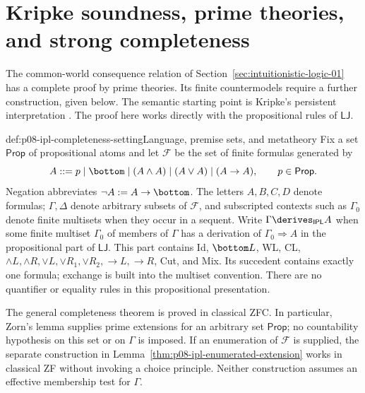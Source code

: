 \section{Kripke soundness, prime theories, and strong completeness}
\label{sec:p08-ipl-kripke-completeness}

The common-world consequence relation of
Section~\ref{sec:intuitionistic-logic-01} has a complete proof by prime
theories. Its finite countermodels require a further construction, given
below. The semantic starting point is Kripke's persistent interpretation
\cite[pp.~93--95]{Kripke1965}. The proof here works directly with the
propositional rules of \hyperref[sheet:lj]{\(\mathsf{LJ}\)}.

\begin{hbconvention}{def:p08-ipl-completeness-setting}{Language, premise sets, and metatheory}
Fix a set \(\mathsf{Prop}\) of propositional atoms and let \(\mathcal F\)
be the set of finite formulas generated by
\[
  A ::= p\mid\bottom\mid(A\land A)\mid(A\lor A)\mid(A\to A),
  \qquad p\in\mathsf{Prop}.
\]
Negation abbreviates \(\neg A:=A\to\bottom\). The letters \(A,B,C,D\)
denote formulas; \(\Gamma,\Delta\) denote arbitrary subsets of
\(\mathcal F\), and subscripted contexts such as \(\Gamma_0\) denote
finite multisets when they occur in a sequent. Write
\(\Gamma\derives_{\mathsf{IPL}}A\) when some finite multiset
\(\Gamma_0\) of members of \(\Gamma\) has a derivation of
\(\Gamma_0\Rightarrow A\) in the propositional part of
\(\mathsf{LJ}\). This part contains Id, \(\bottom L\), WL, CL,
\(\land L,\land R,\lor L,\lor R_1,\lor R_2,\to L,\to R\),
Cut, and Mix. Its succedent contains exactly one formula; exchange is built
into the multiset convention. There are no quantifier or equality rules in
this propositional presentation.

The general completeness theorem is proved in classical ZFC. In particular,
Zorn's lemma supplies prime extensions for an arbitrary set
\(\mathsf{Prop}\); no countability hypothesis on this set or on
\(\Gamma\) is imposed. If an enumeration of \(\mathcal F\) is supplied,
the separate construction in Lemma~\ref{thm:p08-ipl-enumerated-extension}
works in classical ZF without invoking a choice principle. Neither
construction assumes an effective membership test for \(\Gamma\).
\end{hbconvention}

